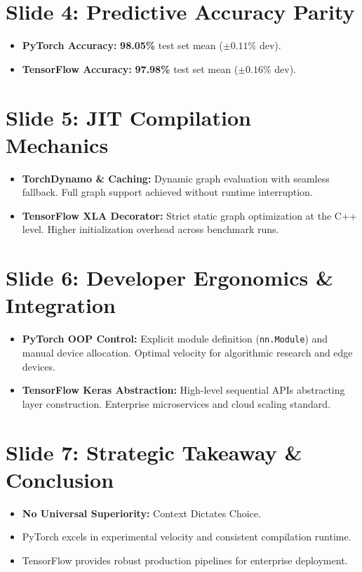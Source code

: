 \documentclass[11pt, a4paper]{article}
\begin{document}
\section*{Slide 4: Predictive Accuracy Parity}
\begin{itemize}
    \item \textbf{PyTorch Accuracy:} \textbf{98.05\%} test set mean ($\pm 0.11\%$ dev).
    \item \textbf{TensorFlow Accuracy:} \textbf{97.98\%} test set mean ($\pm 0.16\%$ dev).
\end{itemize}

\section*{Slide 5: JIT Compilation Mechanics}
\begin{itemize}
    \item \textbf{TorchDynamo \& Caching:} Dynamic graph evaluation with seamless fallback. Full graph support achieved without runtime interruption.
    \item \textbf{TensorFlow XLA Decorator:} Strict static graph optimization at the C++ level. Higher initialization overhead across benchmark runs.
\end{itemize}

\section*{Slide 6: Developer Ergonomics \& Integration}
\begin{itemize}
    \item \textbf{PyTorch OOP Control:} Explicit module definition (\texttt{nn.Module}) and manual device allocation. Optimal velocity for algorithmic research and edge devices.
    \item \textbf{TensorFlow Keras Abstraction:} High-level sequential APIs abstracting layer construction. Enterprise microservices and cloud scaling standard.
\end{itemize}

\section*{Slide 7: Strategic Takeaway \& Conclusion}
\begin{itemize}
    \item \textbf{No Universal Superiority:} Context Dictates Choice.
    \item PyTorch excels in experimental velocity and consistent compilation runtime.
    \item TensorFlow provides robust production pipelines for enterprise deployment.
\end{itemize}
\end{document}
